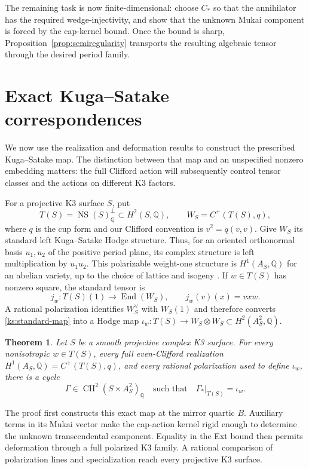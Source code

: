 \documentclass[11pt]{article}
\numberwithin{equation}{section}
\newtheorem{theorem}{Theorem}[section]
\theoremstyle{definition}
\theoremstyle{remark}
\begin{document}
The remaining task is now finite-dimensional: choose \(C_*\) so that
the annihilator has the required wedge-injectivity, and show that the
unknown Mukai component is forced by the cap-kernel bound.  Once the
bound is sharp, Proposition~\ref{prop:semiregularity} transports the
resulting algebraic tensor through the desired period family.

\section{Exact Kuga--Satake correspondences}
\label{sec:exactks}

We now use the realization and deformation results to construct the
prescribed Kuga--Satake map.  The distinction between that map and an
unspecified nonzero embedding matters: the full Clifford action will
subsequently control tensor classes and the actions on different K3
factors.

For a projective K3 surface $S$, put
\[
 T(S)=\operatorname{NS}(S)_{\mathbb Q}^{\perp}\subset H^2(S,\mathbb Q),
 \qquad W_S=C^+(T(S),q),
\]
where $q$ is the cup form and our Clifford convention is
$v^2=q(v,v)$.  Give $W_S$ its standard left Kuga--Satake Hodge
structure.  Thus, for an oriented orthonormal basis $u_1,u_2$ of
the positive period plane, its complex structure is left
multiplication by $u_1u_2$.  This polarizable weight-one structure
is $H^1(A_S,\mathbb Q)$ for an abelian variety, up to the choice of lattice
and isogeny \cite{KugaSatake,DeligneK3,VanGeemenKS}.  If
$w\in T(S)$ has nonzero square, the standard tensor is
\begin{equation}
 \label{ks:standard-map}
 j_w:T(S)(1)\longrightarrow\operatorname{End}(W_S),
 \qquad j_w(v)(x)=vxw.
\end{equation}
A rational polarization identifies $W_S^\vee$ with $W_S(1)$ and
therefore converts \eqref{ks:standard-map} into a Hodge map
$\iota_w:T(S)\to W_S\otimes W_S\subset H^2(A_S^2,\mathbb Q)$.

\begin{theorem}
 \label{thm:exact-ks}
Let $S$ be a smooth projective complex K3 surface.  For every
nonisotropic $w\in T(S)$, every full even-Clifford realization
$H^1(A_S,\mathbb Q)=C^+(T(S),q)$, and every rational polarization used
to define $\iota_w$, there is a cycle
\[
 \Gamma\in\operatorname{CH}^2(S\times A_S^2)_{\mathbb Q}
 \quad\text{such that}\quad
 \Gamma_*|_{T(S)}=\iota_w.
\]
\end{theorem}

The proof first constructs this exact map at the mirror quartic
$B$.  Auxiliary terms in its Mukai vector make the cap-action
kernel rigid enough to determine the unknown transcendental
component.  Equality in the Ext bound then permits deformation
through a full polarized K3 family.  A rational comparison of
polarization lines and specialization reach every projective K3
surface.
\end{document}
